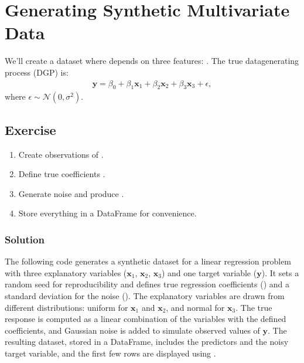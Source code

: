 \documentclass[letterpaper,10pt,english]{jupyterBook}
\begin{document}
\section{Generating Synthetic Multivariate Data}
\label{\detokenize{02:generating-synthetic-multivariate-data}}
\sphinxAtStartPar
We’ll create a dataset where  depends on three features: .
The true data\sphinxhyphen{}generating process (DGP) is:
\begin{equation*}
\begin{split}
  \mathbf y = \beta_0 + \beta_1 \mathbf x_1 + \beta_2 \mathbf x_2 + \beta_3 \mathbf x_3 + \epsilon,
\end{split}
\end{equation*}
\sphinxAtStartPar
where \(\epsilon \sim \mathcal{N}(0, \sigma^2)\).


\subsection{Exercise}
\label{\detokenize{02:exercise}}\begin{enumerate}
%
\item {} 
\sphinxAtStartPar
Create  observations of .

\item {} 
\sphinxAtStartPar
Define true coefficients .

\item {} 
\sphinxAtStartPar
Generate noise and produce .

\item {} 
\sphinxAtStartPar
Store everything in a DataFrame for convenience.

\end{enumerate}


\subsubsection{Solution}
\label{\detokenize{02:solution}}
\sphinxAtStartPar
The following code generates a synthetic dataset for a linear regression problem with three explanatory variables (\(\mathbf x_1\), \(\mathbf x_2\), \(\mathbf x_3\)) and one target variable (\(\mathbf y\)). It sets a random seed for reproducibility and defines true regression coefficients () and a standard deviation for the noise (). The explanatory variables are drawn from different distributions: uniform for \(\mathbf x_1\) and \(\mathbf x_2\), and normal for \(\mathbf x_3\). The true response  is computed as a linear combination of the variables with the defined coefficients, and Gaussian noise is added to simulate observed values of \(\mathbf y\). The resulting dataset, stored in a  DataFrame, includes the predictors and the noisy target variable, and the first few rows are displayed using .
\end{document}
